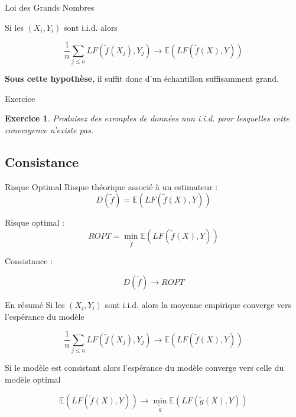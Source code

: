 \documentclass[11pt]{beamer}
\newtheorem{exercice}{Exercice}
\begin{document}
\begin{frame}{Loi des Grands Nombres}

Si les $(X_i,Y_i)$ sont i.i.d. alors 

$$\frac{1}{n}\sum_{j \leq n} LF(\tilde{f}(X_j),Y_j) \longrightarrow \mathbb{E}(LF(\tilde{f}(X),Y))$$

\pause

\textbf{Sous cette hypothèse}, il suffit donc d'un échantillon suffisamment grand.

\end{frame}

\begin{frame}{Exercice}
\begin{exercice}
Produisez des exemples de données non i.i.d. pour lesquelles cette convergence n'existe pas.
\end{exercice}
\end{frame}


\subsection{Consistance}

\begin{frame}{Risque Optimal}
Risque théorique associé à un estimateur :
$$D(\tilde{f}) = \mathbb{E}(LF(\tilde{f}(X),Y))$$
\vspace{0.3cm}

Risque optimal :
$$ROPT = \min_{\tilde{f}}\mathbb{E}(LF(\tilde{f}(X),Y))$$

\pause

\vspace{0.3cm}

Consistance :

$$D(\tilde{f})\longrightarrow ROPT$$

\end{frame}

\begin{frame}{En résumé}
Si les $(X_i,Y_i)$ sont i.i.d. alors la moyenne empirique converge vers l'espérance du modèle

$$\frac{1}{n}\sum_{j \leq n} LF(\tilde{f}(X_j),Y_j) \longrightarrow \mathbb{E}(LF(\tilde{f}(X),Y))$$

Si le modèle est consistant alors l'espérance du modèle converge vers celle du modèle optimal

$$\mathbb{E}(LF(\tilde{f}(X),Y))\longrightarrow \min_{\tilde{g}}\mathbb{E}(LF(\tilde{g}(X),Y))$$ 
\end{frame}
\end{document}
